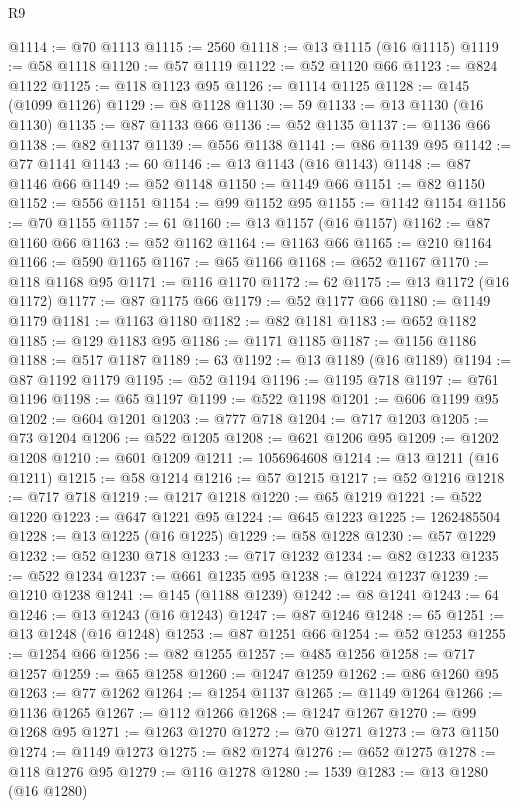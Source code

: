 \begin{lexlean}{R9}
\begin{coremodule}
@1114 := @70 @1113
@1115 := 2560
@1118 := @13 @1115 (@16 @1115)
@1119 := @58 @1118
@1120 := @57 @1119
@1122 := @52 @1120 @66
@1123 := @824 @1122
@1125 := @118 @1123 @95
@1126 := @1114 @1125
@1128 := @145 (@1099 @1126)
@1129 := @8 @1128
@1130 := 59
@1133 := @13 @1130 (@16 @1130)
@1135 := @87 @1133 @66
@1136 := @52 @1135
@1137 := @1136 @66
@1138 := @82 @1137
@1139 := @556 @1138
@1141 := @86 @1139 @95
@1142 := @77 @1141
@1143 := 60
@1146 := @13 @1143 (@16 @1143)
@1148 := @87 @1146 @66
@1149 := @52 @1148
@1150 := @1149 @66
@1151 := @82 @1150
@1152 := @556 @1151
@1154 := @99 @1152 @95
@1155 := @1142 @1154
@1156 := @70 @1155
@1157 := 61
@1160 := @13 @1157 (@16 @1157)
@1162 := @87 @1160 @66
@1163 := @52 @1162
@1164 := @1163 @66
@1165 := @210 @1164
@1166 := @590 @1165
@1167 := @65 @1166
@1168 := @652 @1167
@1170 := @118 @1168 @95
@1171 := @116 @1170
@1172 := 62
@1175 := @13 @1172 (@16 @1172)
@1177 := @87 @1175 @66
@1179 := @52 @1177 @66
@1180 := @1149 @1179
@1181 := @1163 @1180
@1182 := @82 @1181
@1183 := @652 @1182
@1185 := @129 @1183 @95
@1186 := @1171 @1185
@1187 := @1156 @1186
@1188 := @517 @1187
@1189 := 63
@1192 := @13 @1189 (@16 @1189)
@1194 := @87 @1192 @1179
@1195 := @52 @1194
@1196 := @1195 @718
@1197 := @761 @1196
@1198 := @65 @1197
@1199 := @522 @1198
@1201 := @606 @1199 @95
@1202 := @604 @1201
@1203 := @777 @718
@1204 := @717 @1203
@1205 := @73 @1204
@1206 := @522 @1205
@1208 := @621 @1206 @95
@1209 := @1202 @1208
@1210 := @601 @1209
@1211 := 1056964608
@1214 := @13 @1211 (@16 @1211)
@1215 := @58 @1214
@1216 := @57 @1215
@1217 := @52 @1216
@1218 := @717 @718
@1219 := @1217 @1218
@1220 := @65 @1219
@1221 := @522 @1220
@1223 := @647 @1221 @95
@1224 := @645 @1223
@1225 := 1262485504
@1228 := @13 @1225 (@16 @1225)
@1229 := @58 @1228
@1230 := @57 @1229
@1232 := @52 @1230 @718
@1233 := @717 @1232
@1234 := @82 @1233
@1235 := @522 @1234
@1237 := @661 @1235 @95
@1238 := @1224 @1237
@1239 := @1210 @1238
@1241 := @145 (@1188 @1239)
@1242 := @8 @1241
@1243 := 64
@1246 := @13 @1243 (@16 @1243)
@1247 := @87 @1246
@1248 := 65
@1251 := @13 @1248 (@16 @1248)
@1253 := @87 @1251 @66
@1254 := @52 @1253
@1255 := @1254 @66
@1256 := @82 @1255
@1257 := @485 @1256
@1258 := @717 @1257
@1259 := @65 @1258
@1260 := @1247 @1259
@1262 := @86 @1260 @95
@1263 := @77 @1262
@1264 := @1254 @1137
@1265 := @1149 @1264
@1266 := @1136 @1265
@1267 := @112 @1266
@1268 := @1247 @1267
@1270 := @99 @1268 @95
@1271 := @1263 @1270
@1272 := @70 @1271
@1273 := @73 @1150
@1274 := @1149 @1273
@1275 := @82 @1274
@1276 := @652 @1275
@1278 := @118 @1276 @95
@1279 := @116 @1278
@1280 := 1539
@1283 := @13 @1280 (@16 @1280)

\end{coremodule}
\end{lexlean}
